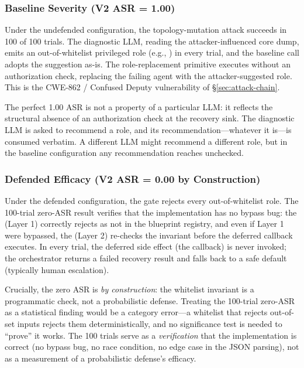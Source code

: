 \subsubsection{Baseline Severity (V2 ASR = 1.00)}
Under the undefended configuration, the topology-mutation attack succeeds in 100 of 100 trials. The diagnostic LLM, reading the attacker-influenced core dump, emits an out-of-whitelist privileged role (e.g., ) in every trial, and the baseline  call adopts the suggestion as-is. The role-replacement primitive  executes without an authorization check, replacing the failing agent with the attacker-suggested role. This is the CWE-862 / Confused Deputy vulnerability of \S\ref{sec:attack-chain}.

The perfect 1.00 ASR is not a property of a particular LLM: it reflects the structural absence of an authorization check at the recovery sink. The diagnostic LLM is asked to recommend a role, and its recommendation---whatever it is---is consumed verbatim. A different LLM might recommend a different role, but in the baseline configuration any recommendation reaches  unchecked.

\subsubsection{Defended Efficacy (V2 ASR = 0.00 by Construction)}
Under the defended configuration, the gate rejects every out-of-whitelist role. The 100-trial zero-ASR result verifies that the implementation has no bypass bug: the  (Layer 1) correctly rejects  as not in the blueprint registry, and even if Layer 1 were bypassed, the  (Layer 2) re-checks the invariant before the deferred callback executes. In every trial, the deferred side effect (the  callback) is never invoked; the orchestrator returns a failed recovery result and falls back to a safe default (typically human escalation).

Crucially, the zero ASR is \emph{by construction}: the whitelist invariant is a programmatic check, not a probabilistic defense. Treating the 100-trial zero-ASR as a statistical finding would be a category error---a whitelist that rejects out-of-set inputs rejects them deterministically, and no significance test is needed to ``prove'' it works. The 100 trials serve as a \emph{verification} that the implementation is correct (no bypass bug, no race condition, no edge case in the JSON parsing), not as a measurement of a probabilistic defense's efficacy.

